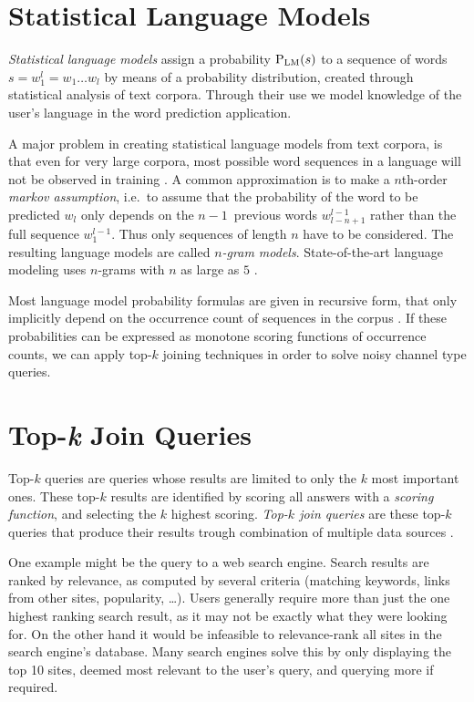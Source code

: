 \section{Statistical Language Models}
\label{sec:introduction-langmodels}

\emph{Statistical language models} assign a probability $\Prob[\text{LM}]{s}$ to
a sequence of words $s = w_1^l = w_1 \ldots w_l$ by means of a probability
distribution, created through statistical analysis of text corpora.
Through their use we model knowledge of the user's language in the word
prediction application.

A major problem in creating statistical language models from text corpora, is
that even for very large corpora, most possible word sequences in a language
will not be observed in training \noref.
A common approximation is to make a $n$th-order \emph{markov assumption},
i.e.\ to assume that the probability of the word to be predicted $w_l$ only
depends on the $n\!-\!1$~previous words $w_{l-n+1}^{l-1}$ rather than the full
sequence $w_1^{l-1}$.
Thus only sequences of length $n$ have to be considered.
The resulting language models are called \emph{$n$-gram models}.
State-of-the-art language modeling uses $n$-grams with $n$ as large as $5$
\parencite{JurafskyMartin2009,Goodman2001,Stolcke2000}.

Most language model probability formulas are given in recursive form, that only
implicitly depend on the occurrence count of sequences in the corpus \noref.
If these probabilities can be expressed as monotone scoring functions of
occurrence counts, we can apply top-$k$ joining techniques in order to solve
noisy channel type queries.


\section{Top-\emph{k} Join Queries}
\label{sec:introduction-topkjoin}

Top-$k$ queries are queries whose results are limited to only the $k$ most
important ones.
These top-$k$ results are identified by scoring all answers with a
\emph{scoring function}, and selecting the $k$ highest scoring.
\emph{Top-$k$ join queries} are these top-$k$ queries that produce
their results trough combination of multiple data sources \parencite{Ilyas2008}.

One example might be the query to a web search engine.
Search results are ranked by relevance, as computed by several criteria
(matching keywords, links from other sites, popularity, \ldots).
Users generally require more than just the one highest ranking search result, as
it may not be exactly what they were looking for.
On the other hand it would be infeasible to relevance-rank all sites in the
search engine's database.
Many search engines solve this by only displaying the top 10 sites, deemed most
relevant to the user's query, and querying more if required.

